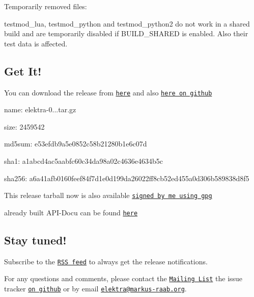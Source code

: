 Temporarily removed files\+:


\begin{DoxyItemize}
\item {\ttfamily testmod\+\_\+lua}, {\ttfamily testmod\+\_\+python} and {\ttfamily testmod\+\_\+python2} do not work in a shared build and are temporarily disabled if {\ttfamily B\+U\+I\+L\+D\+\_\+\+S\+H\+A\+R\+E\+D} is enabled. Also their test data is affected.
\end{DoxyItemize}

\subsection*{Get It!}

You can download the release from \href{http://www.libelektra.org/ftp/elektra/releases/elektra-0.8.17.tar.gz}{\tt here} and also \href{https://github.com/ElektraInitiative/ftp/tree/master/releases/elektra-0.8.17.tar.gz}{\tt here on github}


\begin{DoxyItemize}
\item name\+: elektra-\/0...\+tar.\+gz
\item size\+: 2459542
\item md5sum\+: e53efdb9a5e0852c58b21280b1e6c07d
\item sha1\+: a1abcd4ac5aabfc60c34da98a02c4636e4634b5c
\item sha256\+: a6a41afb0160feef84f7d1e0d199da26022ff8cb52ed455a0d306b589838d8f5
\end{DoxyItemize}

This release tarball now is also available \href{http://www.libelektra.org/ftp/elektra/releases/elektra-0.8.17.tar.gz.gpg}{\tt signed by me using gpg}

already built A\+P\+I-\/\+Docu can be found \href{http://doc.libelektra.org/api/0.8.17/html/}{\tt here}

\subsection*{Stay tuned!}

Subscribe to the \href{http://doc.libelektra.org/news/feed.rss}{\tt R\+S\+S feed} to always get the release notifications.

For any questions and comments, please contact the \href{https://lists.sourceforge.net/lists/listinfo/registry-list}{\tt Mailing List} the issue tracker \href{http://git.libelektra.org/issues}{\tt on github} or by email \href{mailto:elektra@markus-raab.org}{\tt elektra@markus-\/raab.\+org}.


